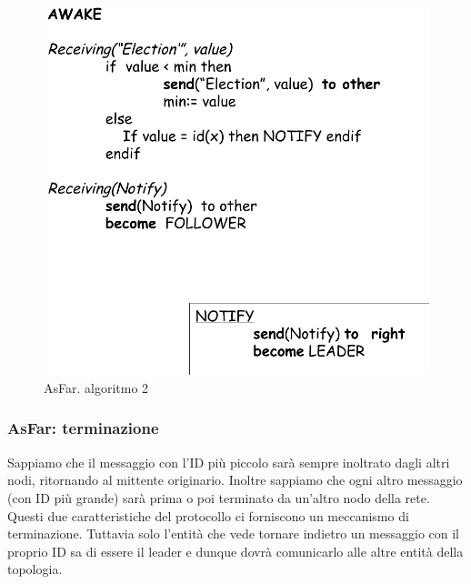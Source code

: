 \documentclass[12pt]{article}
\begin{document}
			\begin{figure}[h!]
				\centering
				\includegraphics[scale=0.30]{img/asfar4.png}
				\caption{AsFar. algoritmo 2}
			\end{figure}
			
		\subsubsection{AsFar: terminazione}
			Sappiamo che il messaggio con l'ID più piccolo sarà sempre inoltrato dagli altri nodi, ritornando al mittente originario. Inoltre sappiamo che ogni altro messaggio (con ID più grande) sarà prima o poi terminato da un'altro nodo della rete. Questi due caratteristiche del protocollo ci forniscono un meccanismo di terminazione. Tuttavia solo l'entità che vede tornare indietro un messaggio con il proprio ID sa di essere il leader e dunque dovrà comunicarlo alle altre entità della topologia.
\end{document}

